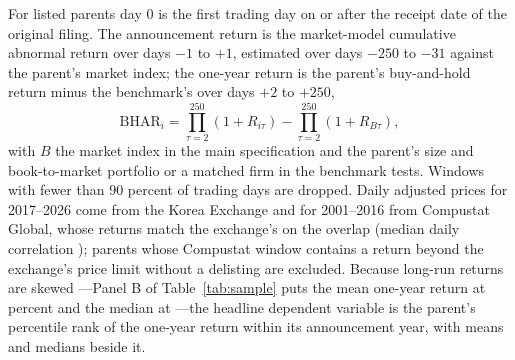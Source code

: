 For listed parents day 0 is the first trading day on or after the receipt date of the original filing. The announcement return is the market-model cumulative abnormal return over days $-1$ to $+1$, estimated over days $-250$ to $-31$ against the parent's market index; the one-year return is the parent's buy-and-hold return minus the benchmark's over days $+2$ to $+250$,
\begin{equation}\label{eq:bhar}
\mathrm{BHAR}_i = \prod_{\tau=2}^{250}(1+R_{i\tau}) - \prod_{\tau=2}^{250}(1+R_{B\tau}),
\end{equation}
with $B$ the market index in the main specification and the parent's size and book-to-market portfolio or a matched firm in the benchmark tests. Windows with fewer than 90 percent of trading days are dropped. Daily adjusted prices for 2017--2026 come from the Korea Exchange and for 2001--2016 from Compustat Global, whose returns match the exchange's on the overlap (median daily correlation \KRXCompustatCorr{}); \GlitchExcluded{} parents whose Compustat window contains a return beyond the exchange's price limit without a delisting are excluded. Because long-run returns are skewed \cite{barber1997, lyon1999, fama1998, mitchell2000}---Panel B of Table~\ref{tab:sample} puts the mean one-year return at \DescBharMadjPPMean{} percent and the median at \DescBharMadjPPMedian{}---the headline dependent variable is the parent's percentile rank of the one-year return within its announcement year, with means and medians beside it.

